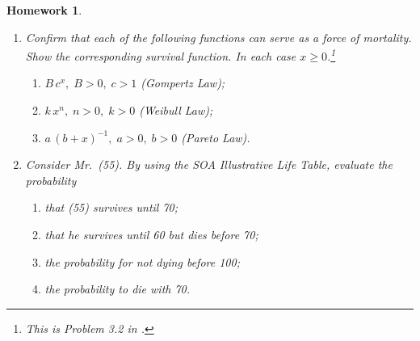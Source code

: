 \documentclass[11pt,fleqn,oneside]{book}
\newtheorem{homework}{Homework}
\begin{document}
\begin{homework}
\label{HW4}
\begin{enumerate}
\item Confirm that each of the following functions can serve as a force of mortality. Show the corresponding survival function. In each case $x\geq 0$.\footnote{This is Problem 3.2 in \cite{BOWERS}.}
\begin{enumerate}
\item $B\,c^x,\;B>0,\;c>1$ (Gompertz Law); 
\item $k\,x^n,\;n>0,\;k>0$ (Weibull Law);
\item $a\,(b+x)^{-1},\;a>0,\;b>0$ (Pareto Law).
\end{enumerate}
\item Consider Mr.\ (55). By using the SOA Illustrative Life Table, evaluate the probability
\begin{enumerate}
\item that (55) survives until 70;
\item that he survives until 60 but dies before 70;
\item the probability for not dying before 100;
\item the probability to die with 70.
\end{enumerate}
\end{enumerate}
\end{homework}
\end{document}
